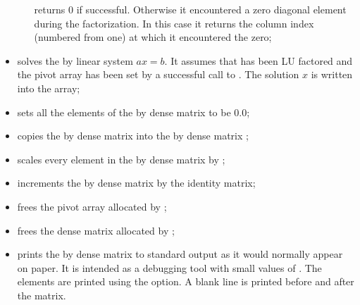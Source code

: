 \begin{itemize}
\begin{enumerate}
     returns 0 if successful. Otherwise it encountered a zero  
    diagonal element during the factorization. In this case it     
    returns the column index (numbered from one) at which it       
    encountered the zero;
    \end{enumerate}

\item {}
  \par {} solves the  by  linear system $ax = b$. 
  It assumes that  has been LU factored and the pivot array  has  
  been set by a successful call to . The solution $x$   
  is written into the  array;

\item {}
  \par {} sets all the elements of the  by  dense matrix
   to be $0.0$;

\item {}
  \par {} copies the  by  dense matrix  into the
   by  dense matrix ;

\item {}
  \par {} scales every element in the  by  dense
  matrix  by ;

\item {}
  \par {} increments the  by  dense matrix  by the
  identity matrix;

\item {}
  \par {} frees the pivot array  allocated by ;

\item {}
  \par {} frees the dense matrix  allocated by ;

\item {}
  \par {} prints the  by  dense matrix  to standard     
  output as it would normally appear on paper. It is intended as 
  a debugging tool with small values of . The elements are      
  printed using the  option. A blank line is printed before    
  and after the matrix. 

\end{itemize}
